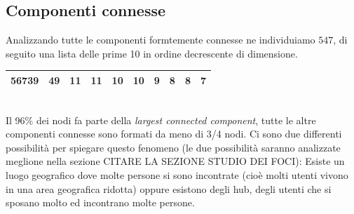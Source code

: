\documentclass[a4paper]{article}
\newcommand{\lcc}{\textit{largest connected component}}
\begin{document}
\subsection{Componenti connesse}
Analizzando tutte le componenti formtemente connesse ne individuiamo $547$, di seguito una lista delle prime 10 in ordine decrescente di dimensione.\\
\begin{tabular}{ | c | c | c | c | c | c | c | c | c | c | }
  \hline
  56739 & 49 & 11 & 11 & 10 & 10 & 9 & 8 & 8 & 7\\
  \hline
\end{tabular}\\
Il 96\% dei nodi fa parte della \lcc, tutte le altre componenti connesse sono formati da meno di 3/4 nodi. 
Ci sono due differenti possibilità per spiegare questo fenomeno (le due possibilità saranno analizzate meglione nella sezione CITARE LA SEZIONE STUDIO DEI FOCI): Esiste un luogo geografico dove molte persone si sono incontrate (cioè molti utenti vivono in una area geografica ridotta) oppure esistono degli hub, degli utenti che si sposano molto ed incontrano molte persone.
\end{document}

